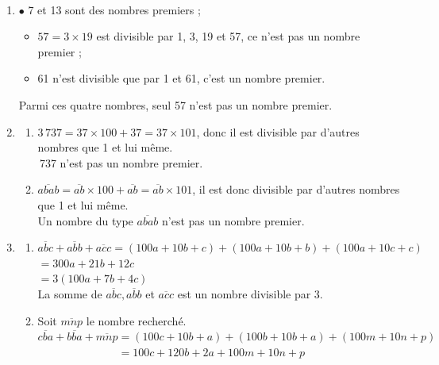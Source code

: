 \begin{corrige}
\ \\ [-5mm]
   \begin{enumerate}
      \item \textcolor{G1}{$\bullet$} 7 et 13 sont des nombres premiers ;
         \begin{itemize}
            \item $57 =3\times19$ est divisible par 1, 3, 19 et 57, ce n'est pas un nombre premier ;
            \item 61 n'est divisible que par 1 et 61, c'est un nombre premier.
         \end{itemize}
         {\blue Parmi ces quatre nombres, seul 57 n'est pas un nombre premier.}
      \item
         \begin{enumerate}
            \item $3\,737 =37\times100+37 =37\times101$, donc il est divisible par d'autres nombres que 1 et lui même. \\
               {\,737 n'est pas un nombre premier.}
            \item $\overline{abab} =\overline{ab}\times100+\overline{ab} =\overline{ab}\times101$, il est donc divisible par d'autres nombres que 1 et lui même. \\
               {\blue Un nombre du type $\overline{abab}$ n'est pas un nombre premier.}
         \end{enumerate}
      \setcounter{enumi}{2}
      \item 
         \begin{enumerate}
            \item $\overline{abc}+\overline{abb}+\overline{acc} =(100a+10b+c)+(100a+10b+b)+(100a+10c+c)$ \\
               \hspace*{3.1cm} $=300a+21b+12c$ \\
               \hspace*{3.1cm} $=3(100a+7b+4c)$ \\
               {\blue La somme de $\overline{abc}, \overline{abb}$ et $\overline{acc}$ est un nombre divisible par 3.}
            \item Soit $\overline{mnp}$ le nombre recherché. \\
               $\overline{cba}+\overline{bba}+\overline{mnp} =(100c+10b+a)+(100b+10b+a)+(100m+10n+p)$ \\
               $\phantom{\overline{cba}+\overline{bba}+\overline{mnp}} =100c+120b+2a+100m+10n+p$ \\

\end{enumerate}
\end{enumerate}
\end{corrige}

